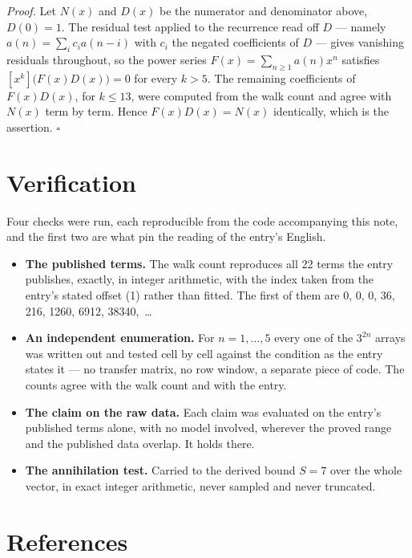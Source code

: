 \documentclass[11pt]{article}
\theoremstyle{definition}
\begin{document}
{\itshape Proof.} Let $N(x)$ and $D(x)$ be the numerator and denominator above, $D(0)=1$. The residual test applied to the recurrence read off $D$ --- namely $a(n) = \sum_i c_i a(n-i)$ with $c_i$ the negated coefficients of $D$ --- gives vanishing residuals throughout, so the power series $F(x)=\sum_{n\ge 1}a(n)x^n$ satisfies $[x^k]\bigl(F(x)D(x)\bigr) = 0$ for every $k > 5$. The remaining coefficients of $F(x)D(x)$, for $k \le 13$, were computed from the walk count and agree with $N(x)$ term by term. Hence $F(x)D(x) = N(x)$ identically, which is the assertion. $\square$

\section{Verification}

Four checks were run, each reproducible from the code accompanying this note, and the first two are what pin the reading of the entry's English.

\begin{itemize}

\item {\bfseries The published terms.} The walk count reproduces all 22 terms the entry publishes, exactly, in integer arithmetic, with the index taken from the entry's stated offset (1) rather than fitted. The first of them are 0, 0, 0, 36, 216, 1260, 6912, 38340,~\dots

\item {\bfseries An independent enumeration.} For $n = 1,\dots,5$ every one of the $3^{2n}$ arrays was written out and tested cell by cell against the condition as the entry states it --- no transfer matrix, no row window, a separate piece of code. The counts agree with the walk count and with the entry.

\item {\bfseries The claim on the raw data.} Each claim was evaluated on the entry's published terms alone, with no model involved, wherever the proved range and the published data overlap. It holds there.

\item {\bfseries The annihilation test.} Carried to the derived bound $S = 7$ over the whole vector, in exact integer arithmetic, never sampled and never truncated.

\end{itemize}

\section{References}
\end{document}
